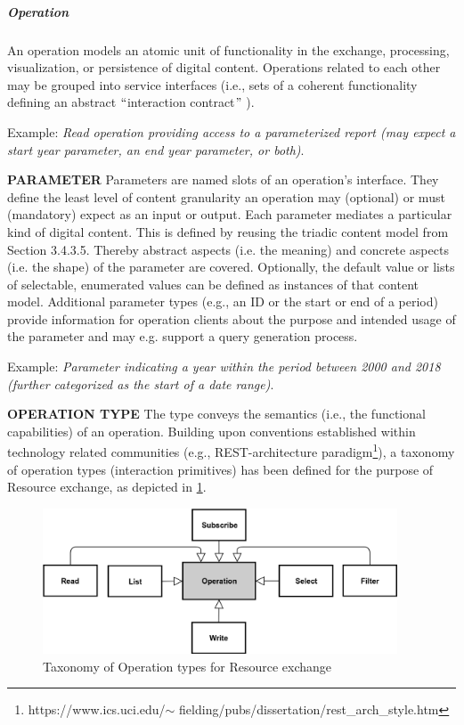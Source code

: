 \subparagraph*{Operation}
An operation models an atomic unit of functionality in the exchange, processing, visualization, or persistence of digital content. Operations related to each other may be grouped into service interfaces (i.e., sets of a coherent functionality defining an abstract $``$interaction contract$"$ ). 

Example: \textit{Read operation providing access to a parameterized report (may expect a start year parameter, an end year parameter, or both)}. 

\textbf{PARAMETER} Parameters are named slots of an operation’s interface. They define the least level of content granularity an operation may (optional) or must (mandatory) expect as an input or output. Each parameter mediates a particular kind of digital content. This is defined by reusing the triadic content model from Section 3.4.3.5. Thereby abstract aspects (i.e. the meaning) and concrete aspects (i.e. the shape) of the parameter are covered. Optionally, the default value or lists of selectable, enumerated values can be defined as instances of that content model. Additional parameter types (e.g., an ID or the start or end of a period) provide information for operation clients about the purpose and intended usage of the parameter and may e.g. support a query generation process. 

Example: \textit{Parameter indicating a year within the period between 2000 and 2018 (further categorized as the start of a date range)}. 

\textbf{OPERATION TYPE} The type conveys the semantics (i.e., the functional capabilities) of an operation. Building upon conventions established within technology related communities (e.g., REST-architecture paradigm\footnote{https://www.ics.uci.edu/$ \sim $ fielding/pubs/dissertation/rest\_arch\_style.htm }), a taxonomy of operation types (interaction primitives) has been defined for the purpose of Resource exchange, as depicted in \ref{fig:Taxonomy_of_Operation_types_for_Resource_exchange}. 




\begin{figure}[H]
	\begin{Center}
		\includegraphics[width=4.15in,height=1.7in]{./media/image40.png}
		\caption{Taxonomy of Operation types for Resource exchange}
		\label{fig:Taxonomy_of_Operation_types_for_Resource_exchange}
	\end{Center}
\end{figure}


